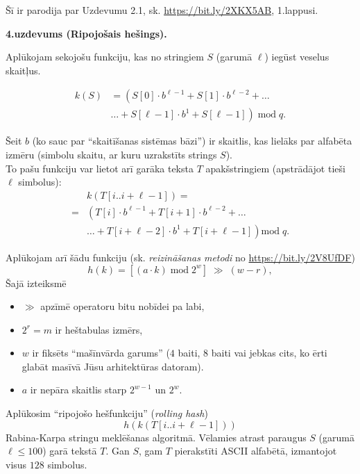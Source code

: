 \documentclass[a4paper,12pt]{article}
\begin{document}
Šī ir parodija par Uzdevumu 2.1, sk. \url{https://bit.ly/2XKX5AB}, 1.lappusi.






\vspace{10pt}
{\bf 4.uzdevums (Ripojošais hešings).}

Aplūkojam sekojošu funkciju, kas no stringiem $S$ (garumā $\ell$) iegūst
veselus skaitļus.

{\small
\begin{align}
k(S) & = \left(S[0]\cdot{}b^{\ell-1} + S[1] \cdot b^{\ell-2} + \ldots  \right. \nonumber \\
     & \left. \ldots + S[\ell - 1] \cdot b^1 + S[\ell - 1]\right)\;\text{mod}\;q.  \label{eq:prehashing}
\end{align}
} 

Šeit $b$ (ko sauc par ``skaitīšanas sistēmas bāzi'') ir skaitlis, kas lielāks par alfabēta izmēru (simbolu skaitu, 
ar kuru uzrakstīts strings $S$).\\
To pašu funkciju var lietot arī garāka teksta $T$ apakšstringiem (apstrādājot tieši $\ell$ simbolus): 
{\small
\begin{align}
  & k(T[i..i+\ell-1]) = \nonumber \\
= & \left(T[i]\cdot{}b^{\ell-1} + T[i+1] \cdot b^{\ell-2} + \right. \ldots  \nonumber \\
  & \left. \ldots + T[i + \ell{} - 2] \cdot b^{1} + T[i + \ell{} - 1]\right) \text{mod}\;q. \label{eq:prehashing2} 
\end{align}
}

Aplūkojam arī šādu funkciju (sk. {\em reizināšanas metodi} no \url{https://bit.ly/2V8UfDF})
\begin{equation}
\label{eq:hashing}
h(k) = \left[ (a \cdot k)\;\text{mod}\;2^w \right]\;\gg\;(w - r),
\end{equation}
Šajā izteiksmē
\begin{itemize}
\item $\gg$ apzīmē operatoru bitu nobīdei pa labi,
\item $2^r = m$ ir heštabulas izmērs,
\item $w$ ir fiksēts ``mašīnvārda garums'' ($4$ baiti, $8$ baiti vai jebkas cits, ko ērti glabāt masīvā Jūsu arhitektūras datoram).
\item $a$ ir nepāra skaitlis starp $2^{w-1}$ un $2^w$.
\end{itemize}

Aplūkosim ``ripojošo hešfunkciju'' ({\em rolling hash}) 
$$h(k(T[i..i+\ell-1]))$$
Rabina-Karpa stringu meklēšanas algoritmā.
Vē\-la\-mies atrast paraugus $S$ (garumā $\ell \leq 100$) garā tekstā $T$.
Gan $S$, gam $T$ pierakstīti ASCII alfabētā, izmantojot visus $128$ simbolus.
\end{document}
